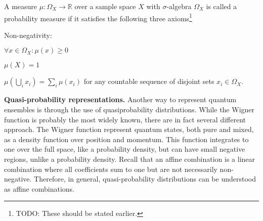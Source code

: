 \documentclass[10pt,twocolumn, nofootinbib]{revtex4-2}
\begin{document}



A measure $\mu: \Omega_X \to \mathbb{R}$ over a sample space $X$ with $\sigma$-algebra $\Omega_X$ is called a probability measure if it satisfies the following three axioms\footnote{TODO: These should be stated earlier.}
\begin{labeling}{Non-negativity:}
	\item[Non-negativity:] $\forall x \in \Omega_X: \mu(x) \ge 0$
	\item[Normalization:] $\mu(X) = 1$
	\item[$\sigma$-additivity:] $\mu ( \bigcup_i x_i ) = \sum_i \mu ( x_i )$ for any countable sequence of disjoint sets $x_i \in \Omega_X$.
\end{labeling}



\textbf{Quasi-probability representations.} Another way to represent quantum ensembles is through the use of quasiprobability distributions. While the Wigner function is probably the most widely known, there are in fact several different approach. The Wigner function represent quantum states, both pure and mixed, as a density function over position and momentum. This function integrates to one over the full space, like a probability density, but can have small negative regions, unlike a probability density. Recall that an affine combination is a linear combination where all coefficients sum to one but are not necessarily non-negative. Therefore, in general, quasi-probability distributions can be understood as affine combinations.
\end{document}
